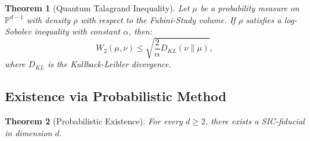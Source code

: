 \documentclass[a4paper,11pt]{article}
\newtheorem{theorem}{Theorem}[section]
\newcommand{\PP}{\mathbb{P}}
\begin{document}
\begin{theorem}[Quantum Talagrand Inequality]\label{thm:quantum-talagrand}
Let $\mu$ be a probability measure on $\PP^{d-1}$ with density $\rho$ with respect to the Fubini-Study volume. If $\rho$ satisfies a log-Sobolev inequality with constant $\alpha$, then:
\begin{equation}
W_2(\mu, \nu) \leq \sqrt{\frac{2}{\alpha} D_{KL}(\nu \| \mu)},
\end{equation}
where $D_{KL}$ is the Kullback-Leibler divergence.
\end{theorem}

\subsection{Existence via Probabilistic Method}

\begin{theorem}[Probabilistic Existence]\label{thm:probabilistic-existence}
For every $d \geq 2$, there exists a SIC-fiducial in dimension $d$.
\end{theorem}
\end{document}
